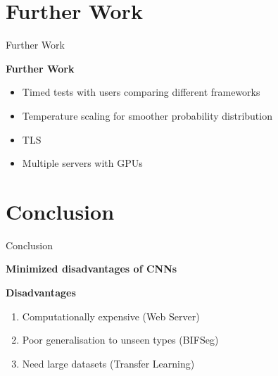 \documentclass[10pt]{beamer}
\begin{document}

\section{Further Work}

\begin{frame}[fragile]{Further Work}
  

  \textbf{Further Work}
  \begin{itemize}
  \item Timed tests with users comparing different frameworks
  \item Temperature scaling for smoother probability distribution
  \item TLS
  \item Multiple servers with GPUs
  \end{itemize}
  
\end{frame}



\section{Conclusion}

\begin{frame}[fragile]{Conclusion}

  \textbf{Minimized disadvantages of CNNs}

  \textbf{Disadvantages}
  \begin{enumerate}
  \item Computationally expensive \checkmark (Web Server)
  \item Poor generalisation to unseen types \checkmark (BIFSeg)
  \item Need large datasets \checkmark (Transfer Learning)
  \end{enumerate}
  
\end{frame}
\end{document}
